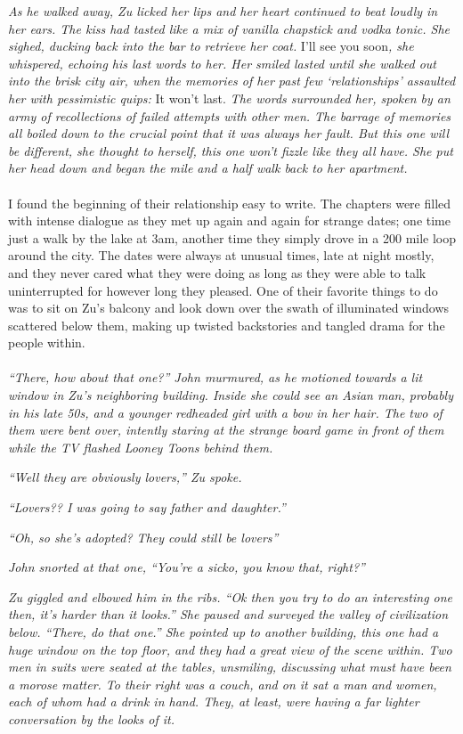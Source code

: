 	\textit{As he walked away, Zu licked her lips and her heart continued to beat loudly in her ears. The kiss had tasted like a mix of vanilla chapstick and vodka tonic. She sighed, ducking back into the bar to retrieve her coat.} I’ll see you soon\textit{, she whispered, echoing his last words to her. Her smiled lasted until she walked out into the brisk city air, when the memories of her past few ‘relationships’ assaulted her with pessimistic quips:} It won’t last. \textit{The words surrounded her, spoken by an army of recollections of failed attempts with other men. The barrage of memories all boiled down to the crucial point that it was always her fault. But this one will be different, she thought to herself, this one won’t fizzle like they all have. She put her head down and began the mile and a half walk back to her apartment.} 
\\\\	
	I found the beginning of their relationship easy to write. The chapters were filled with intense dialogue as they met up again and again for strange dates; one time just a walk by the lake at 3am, another time they simply drove in a 200 mile loop around the city. The dates were always at unusual times, late at night mostly, and they never cared what they were doing as long as they were able to talk uninterrupted for however long they pleased. One of their favorite things to do was to sit on Zu’s balcony and look down over the swath of illuminated windows scattered below them, making up twisted backstories and tangled drama for the people within.
\\\\	
	\textit{“There, how about that one?” John murmured, as he motioned towards a lit window in Zu’s neighboring building. Inside she could see an Asian man, probably in his late 50s, and a younger redheaded girl with a bow in her hair. The two of them were bent over, intently staring at the strange board game in front of them while the TV flashed Looney Toons behind them.}
	
\textit{“Well they are obviously lovers,” Zu spoke. }
	
\textit{	“Lovers?? I was going to say father and daughter.”}
	
\textit{	“Oh, so she’s adopted? They could still be lovers”}
	
\textit{	John snorted at that one, “You’re a sicko, you know that, right?”}
	
\textit{	Zu giggled and elbowed him in the ribs. “Ok then you try to do an interesting one then, it’s harder than it looks.” She paused and surveyed the valley of civilization below. “There, do that one.” She pointed up to another building, this one had a huge window on the top floor, and they had a great view of the scene within. Two men in suits were seated at the tables, unsmiling, discussing what must have been a morose matter. To their right was a couch, and on it sat a man and women, each of whom had a drink in hand. They, at least, were having a far lighter conversation by the looks of it.}
	
